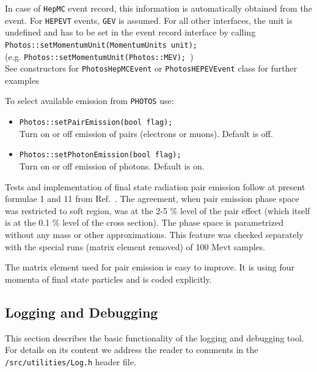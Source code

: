\documentclass[]{Photos_interface_design}
\begin{document}
In case of {\tt HepMC} event record, this information is automatically obtained
from the event. For {\tt HEPEVT} events, {\tt GEV} is assumed. For all other
interfaces, the unit is undefined and has to be set in the event record
interface by calling \\ {\tt Photos::setMomentumUnit(MomentumUnits unit); }\\
(e.g. {\tt Photos::setMomentumUnit(Photos::MEV); })
\\ See
constructors for {\tt PhotosHepMCEvent} or {\tt PhotosHEPEVEvent} class for
further examples

To select available emission from {\tt PHOTOS} use:

\begin{itemize}
  \item {\tt Photos::setPairEmission(bool flag); } \\
        Turn on or off emission of pairs (electrons or muons). Default is off.
  \item {\tt Photos::setPhotonEmission(bool flag); } \\
        Turn on or off emission of photons. Default is on.
\end{itemize}

Tests and implementation of final state radiation 
pair emission follow at present formulae 1 and 11 from Ref.~\cite{Jadach:1993wk}. 
The agreement, when pair emission phase space was restricted to soft region, was  at the   2-5 \% 
level of the pair effect (which itself is at the 0.1 \% level of the cross section). 
The phase space  is parametrized without any mass or other approximations. This feature 
was checked separately with  the special runs (matrix element removed) of 100 Mevt samples.

The matrix element used for pair emission  is easy to improve. It is using four momenta of final state particles and is coded 
explicitly. 
\subsection{Logging and Debugging}
\label{App:Logging}
This section describes the basic functionality of the logging and debugging tool.
For details on its content we address the reader to comments in the {\tt /src/utilities/Log.h} header file.
\end{document}
